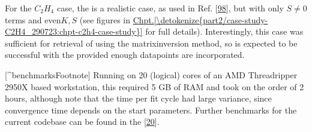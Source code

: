 \documentclass[letterpaper,table,10pt,english]{jupyterBook}
\begin{document}
\sphinxAtStartPar
For the \(C_2H_4\) case, the {\hyperref[\detokenize{backmatter/glossary:term-RWP}]{}} is a realistic case, as used in Ref. {[}\hyperlink{cite.backmatter/bibliography:id634}{98}{]}, but with only \(S\neq0\) terms and even\sphinxhyphen{}\(K,S\)  (see figures in \hyperref[\detokenize{part2/case-study-C2H4_290723:chpt-c2h4-case-study}]{Chpt.\@ \ref{\detokenize{part2/case-study-C2H4_290723:chpt-c2h4-case-study}}} for full details). Interestingly, this case was sufficient for retrieval of {\hyperref[\detokenize{backmatter/glossary:term-MF}]{}} using the matrix\sphinxhyphen{}inversion method, so is expected to be successful with the {\hyperref[\detokenize{backmatter/glossary:term-bootstrap-retrieval-protocol}]{}} provided enough data\sphinxhyphen{}points are incorporated.

\sphinxAtStartPar
{[}\textasciicircum{}benchmarksFootnote{]} Running on 20 (logical) cores of an AMD Threadripper 2950X based workstation, this required 5 GB of RAM and took on the order of 2 hours, although note that the time per fit cycle had large variance, since convergence time depends on the start parameters. Further benchmarks for the current codebase can be found in the  {[}\hyperlink{cite.backmatter/bibliography:id679}{20}{]}.
\end{document}
